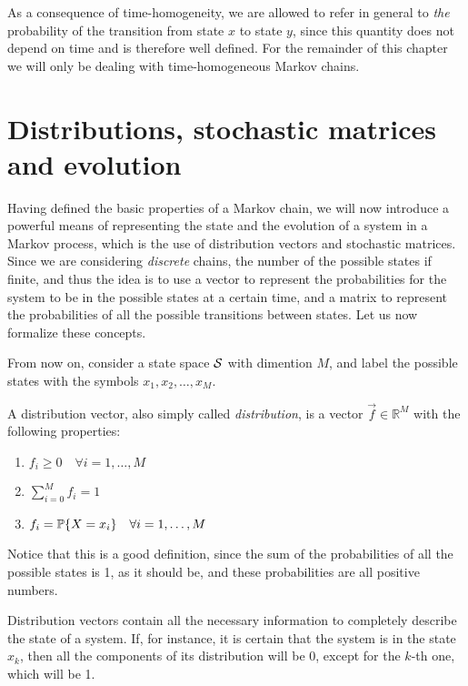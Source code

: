 As a consequence of time-homogeneity, we are allowed to refer in general to \emph{the} probability of the transition from state $x$ to state $y$, since this quantity does not depend on time and is therefore well defined. For the remainder of this chapter we will only be dealing with time-homogeneous Markov chains.

\section{Distributions, stochastic matrices and evolution}
Having defined the basic properties of a Markov chain, we will now introduce a powerful means of representing the state and the evolution of a system in a Markov process, which is the use of distribution vectors and stochastic matrices. Since we are considering \emph{discrete} chains, the number of the possible states if finite, and thus the idea is to use a vector to represent the probabilities for the system to be in the possible states at a certain time, and a matrix to represent the probabilities of all the possible transitions between states. Let us now formalize these concepts.

\smallskip
From now on, consider a state space $\mathcal{S}$ with dimention $M$, and label the possible states with the symbols $x_1, x_2, \dots, x_M$.

\begin{ndef} \label{def:distribution}
    A distribution vector, also simply called \emph{distribution}, is a vector $\vec{f} \in \mathbb{R}^M$ with the following properties:
    \begin{center}
        \begin{enumerate}
            \item $f_i \geq 0 \quad \forall i = 1,\dots, M$
            \item $\sum_{i=0}^M f_i = 1$
            \item $f_i = \mathbb{P}\{X = x_i\} \quad \forall i = 1,\dots, M$
        \end{enumerate}
    \end{center}
    Notice that this is a good definition, since the sum of the probabilities of all the possible states is 1, as it should be, and these probabilities are all positive numbers.
\end{ndef}

Distribution vectors contain all the necessary information to completely describe the state of a system. If, for instance, it is certain that the system is in the state $x_k$, then all the components of its distribution will be 0, except for the $k$-th one, which will be 1.

